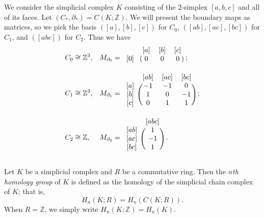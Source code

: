 \begin{example}
    We consider the simplicial complex $K$ consisting of the $2$-simplex $[a,b,c]$ and all of its faces. Let $(C_*, \partial_*) = C(K; \mathbb Z)$. We will present the boundary maps as matrices, so we pick the basis $([a],[b],[c])$ for $C_0$, $([ab], [ac], [bc])$ for $C_1$, and $([abc])$ for $C_2$. Thus we have
    \begin{align*}
        C_0 & \cong \mathbb Z^3, & M_{\partial_0} & =
        \begin{blockarray}{cccc}
            & [a] & [b] & [c] \\
            \begin{block}{c(ccc)}
                {[0]} & 0 & 0 & 0 \\
            \end{block}
        \end{blockarray} ;                      \\
        C_1 & \cong \mathbb Z^3, & M_{\partial_1} & =
        \begin{blockarray}{cccc}
            & [ab] & [ac] & [bc] \\
            \begin{block}{c(ccc)}
                {[a]} & -1 & -1 & 0 \\
                {[b]} & 1 & 0 & -1 \\
                {[c]} & 0 & 1 & 1 \\
            \end{block}
        \end{blockarray}\;;                      \\
        C_2 & \cong \mathbb Z,   & M_{\partial_2} & =
        \begin{blockarray}{cc}
            & [abc] \\
            \begin{block}{c(c)}
                {[ab]} & 1 \\
                {[ac]} & -1 \\
                {[bc]} & 1 \\
            \end{block}
        \end{blockarray}\;.
    \end{align*}
\end{example}

\begin{definition}
    Let $K$ be a simplicial complex and $R$ be a commutative ring. Then the \emph{$n$th homology group} of $K$ is defined as the homology of the simplicial chain complex of $K$; that is,
    \[ H_n(K; R) = H_n(C(K; R)). \]
    When $R = \mathbb Z$, we simply write $H_n(K; \mathbb Z) = H_n(K)$.
\end{definition}

